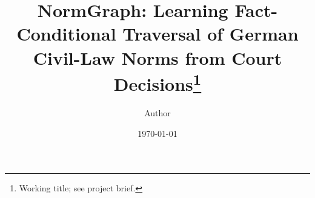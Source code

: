 \documentclass[11pt,a4paper]{article}
\title{NormGraph: Learning Fact-Conditional Traversal of German Civil-Law Norms
  from Court Decisions\thanks{Working title; see project brief.}}
\author{Author}
\date{\today}
\begin{document}
\maketitle

\begin{abstract}
\end{abstract}











\end{document}
